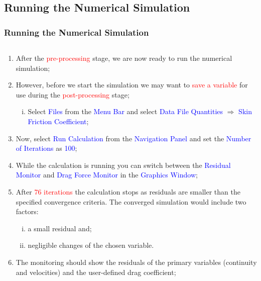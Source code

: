 \documentclass[10pt,compress, unknownkeysallowed]{beamer}
\newcommand{\red}{\textcolor{red}}
\newcommand{\blue}{\textcolor{blue}}
\begin{document}
\subsection{Running the Numerical Simulation}
\begin{frame}
  \frametitle{Running the Numerical Simulation}
    \begin{columns}
        \begin{column}[l]{0.5\linewidth}
           \begin{enumerate}\scriptsize%
                \item<1-> After the \red{pre-processing} stage, we are now ready to run the numerical simulation;
                \item<1-> However, before we start the simulation we may want to \red{save a variable} for use during the \red{post-processing} stage;
                    \begin{enumerate}[i)]\scriptsize
                       \item<2-> Select \blue{Files} from the \blue{Menu Bar} and select \blue{Data File Quantities} $\Rightarrow$ \blue{Skin Friction Coefficient};
                    \end{enumerate}       
                  \item<3-> Now, select \blue{Run Calculation} from the \blue{Navigation Panel} and set the \blue{Number of Iterations} as \blue{100};
                  \item<3-> While the calculation is running you can switch between the \blue{Residual Monitor} and \blue{Drag Force Monitor} in the \blue{Graphics Window};
                  \item<4-> After \red{76 iterations} the calculation stops as residuals are smaller than the specified convergence criteria. The converged simulation would include two factors:
                    \begin{enumerate}[i)]\scriptsize
                       \item<4-> a small residual and;
                       \item<4-> negligible changes of the chosen variable.
                    \end{enumerate}   
                  \item<5-> The monitoring should show the residuals of the primary variables (continuity and velocities) and the user-defined drag coefficient;
           \end{enumerate}
           

\end{column}
\end{columns}
\end{frame}
\end{document}
